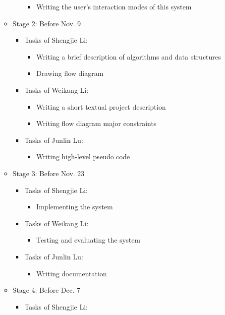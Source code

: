 \begin{itemize}
\begin{itemize}
\begin{itemize}
\begin{itemize}
			\item {Writing the user's interaction modes of this system}
		\end{itemize}
	\end{itemize}
	\item {Stage 2: Before Nov. 9 } 
	\begin{itemize}
		\item {Tasks of Shengjie Li:}
		\begin{itemize}
			\item {Writing a brief description of algorithms and data structures}
			\item {Drawing flow diagram}
		\end{itemize}
		\item {Tasks of Weikang Li:}
		\begin{itemize}
			\item {Writing a short textual project description}
			\item {Writing flow diagram major constraints}
		\end{itemize}
		\item {Tasks of Junlin Lu:}
		\begin{itemize}
			\item {Writing high-level pseudo code}
		\end{itemize}
	\end{itemize}
	\item {Stage 3: Before Nov. 23 } 
	\begin{itemize}
		\item {Tasks of Shengjie Li:}
		\begin{itemize}
			\item {Implementing the system}
		\end{itemize}
		\item {Tasks of Weikang Li:}
		\begin{itemize}
			\item {Testing and evaluating the system}
		\end{itemize}
		\item {Tasks of Junlin Lu:}
		\begin{itemize}
			\item {Writing documentation}
		\end{itemize}
	\end{itemize}
	\item {Stage 4: Before Dec. 7 } 
	\begin{itemize}
		\item {Tasks of Shengjie Li:}
		\begin{itemize}

\end{itemize}
\end{itemize}
\end{itemize}
\end{itemize}
